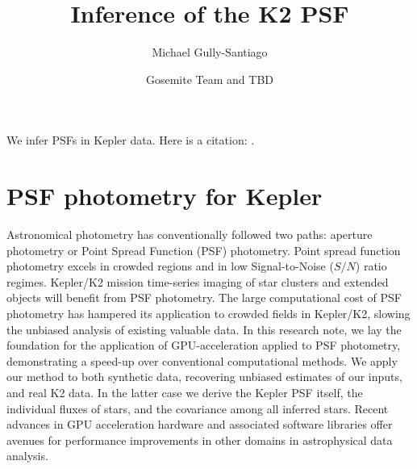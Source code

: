 \documentclass{rnaastex}
\begin{document}
\title{Inference of the K2 PSF}


\author[0000-0002-4020-3457]{Michael Gully-Santiago}

\author{Gosemite Team and TBD}


\section{}

We infer PSFs in Kepler data.  Here is a citation: \cite{2015Natur.521..332O}.

\section{PSF photometry for Kepler}
Astronomical photometry has conventionally followed two paths: aperture photometry or Point Spread Function (PSF) photometry.  Point spread function photometry excels in crowded regions and in low Signal-to-Noise ($S/N$) ratio regimes.  Kepler/K2 mission time-series imaging of star clusters and extended objects will benefit from PSF photometry.  The large computational cost of PSF photometry has hampered its application to crowded fields in Kepler/K2, slowing the unbiased analysis of existing valuable data. In this research note, we lay the foundation for the application of GPU-acceleration applied to PSF photometry, demonstrating a speed-up over conventional computational methods.  We apply our method to both synthetic data, recovering unbiased estimates of our inputs, and real K2 data.  In the latter case we derive the Kepler PSF itself, the individual fluxes of stars, and the covariance among all inferred stars.  Recent advances in GPU acceleration hardware and associated software libraries offer avenues for performance improvements in other domains in astrophysical data analysis.
\end{document}
